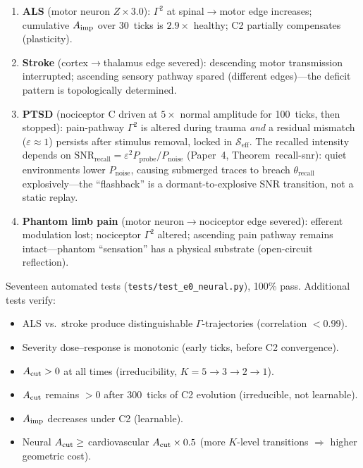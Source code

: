\documentclass[aps,pre,twocolumn,superscriptaddress,floatfix]{revtex4-2}
\begin{document}
\begin{enumerate}
  \item \textbf{ALS} (motor neuron $Z \times 3.0$):
    $\Gamma^2$ at spinal$\to$motor edge increases;
    cumulative $A_{\text{imp}}$ over 30~ticks is $2.9\times$ healthy;
    C2 partially compensates (plasticity).
  \item \textbf{Stroke} (cortex$\to$thalamus edge severed):
    descending motor transmission interrupted; ascending
    sensory pathway spared (different edges)---the deficit
    pattern is topologically determined.
  \item \textbf{PTSD} (nociceptor C driven at $5\times$
    normal amplitude for 100~ticks, then stopped):
    pain-pathway $\Gamma^2$ is altered during trauma
    \emph{and} a residual mismatch ($\varepsilon \approx 1$)
    persists after stimulus removal, locked in
    $\mathcal{S}_{\text{eff}}$.
    The recalled intensity depends on
    $\mathrm{SNR}_{\text{recall}} =
    \varepsilon^2 P_{\text{probe}} / P_{\text{noise}}$
    (Paper~4, Theorem~recall-snr):
    quiet environments lower $P_{\text{noise}}$,
    causing submerged traces to breach
    $\theta_{\text{recall}}$ explosively---the
    ``flashback'' is a dormant-to-explosive
    SNR transition, not a static replay.
  \item \textbf{Phantom limb pain}
    (motor neuron$\to$nociceptor edge severed):
    efferent modulation lost; nociceptor $\Gamma^2$ altered;
    ascending pain pathway remains intact---phantom
    ``sensation'' has a physical substrate
    (open-circuit reflection).
\end{enumerate}

\noindent
Seventeen automated tests
(\texttt{tests/test\_e0\_neural.py}), 100\% pass.
Additional tests verify:
\begin{itemize}
  \item ALS vs.\ stroke produce distinguishable
    $\Gamma$-trajectories (correlation $< 0.99$).
  \item Severity dose--response is monotonic (early ticks,
    before C2 convergence).
  \item $A_{\text{cut}} > 0$ at all times (irreducibility,
    $K{=}5 \to 3 \to 2 \to 1$).
  \item $A_{\text{cut}}$ remains $> 0$ after 300~ticks of C2 evolution
    (irreducible, not learnable).
  \item $A_{\text{imp}}$ decreases under C2 (learnable).
  \item Neural $A_{\text{cut}} \geq$ cardiovascular $A_{\text{cut}} \times 0.5$
    (more $K$-level transitions $\Rightarrow$ higher
    geometric cost).
\end{itemize}
\end{document}
